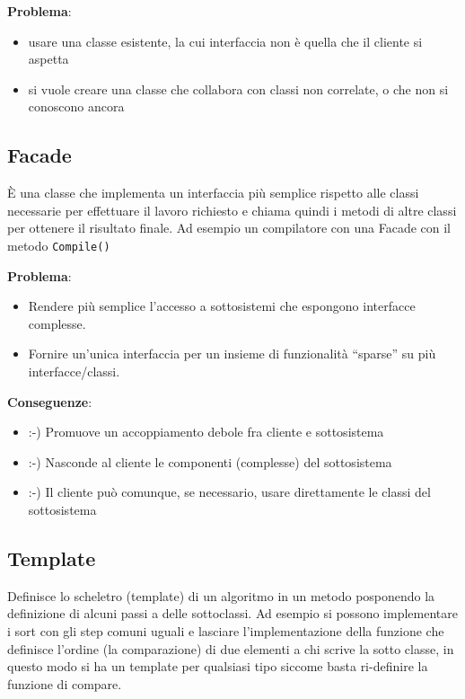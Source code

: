 \vspace{4mm}
\noindent \textbf{Problema}:
\begin{itemize}
    \item usare una classe esistente, la cui interfaccia non è quella che il cliente si aspetta
    \item si vuole creare una classe che collabora con classi non correlate, o che non si conoscono ancora
\end{itemize}

\subsection{Facade}
\`E una classe che implementa un interfaccia più semplice rispetto alle classi necessarie per effettuare il lavoro richiesto e chiama quindi i metodi di altre classi per ottenere il risultato finale. Ad esempio un compilatore con una Facade con il metodo \texttt{Compile()}

\vspace{4mm}
\noindent \textbf{Problema}:
\begin{itemize}
    \item Rendere più semplice l'accesso a sottosistemi che espongono interfacce complesse.
    \item Fornire un’unica interfaccia per un insieme di funzionalità “sparse” su più interfacce/classi.
\end{itemize}

\vspace{4mm}
\noindent \textbf{Conseguenze}:
\begin{itemize}
    \item :-) Promuove un accoppiamento debole fra cliente e sottosistema
    \item :-) Nasconde al cliente le componenti (complesse) del sottosistema
    \item :-) Il cliente può comunque, se necessario, usare direttamente le classi del sottosistema
\end{itemize}

\subsection{Template}
Definisce lo scheletro (template) di un algoritmo in un metodo posponendo la definizione di alcuni passi a delle sottoclassi. Ad esempio si possono implementare i sort con gli step comuni uguali e lasciare l'implementazione della funzione che definisce l'ordine (la comparazione) di due elementi a chi scrive la sotto classe, in questo modo si ha un template per qualsiasi tipo siccome basta ri-definire la funzione di compare.

